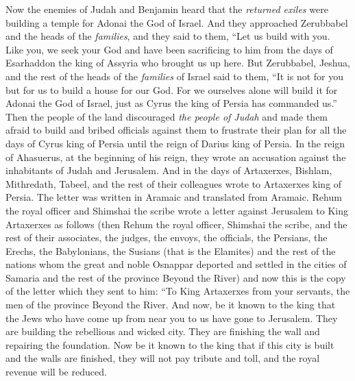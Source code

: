 \begin{biblechapter} %
 Now the enemies of Judah and Benjamin heard that the \textit{returned exiles} were building a temple for Adonai the God of Israel.
\verse And they approached Zerubbabel and the heads of the \textit{families}, and they said to them, “Let us build with you. Like you, we seek your God and have been sacrificing to him from the days of Esarhaddon the king of Assyria who brought us up here.
\verse But Zerubbabel, Jeshua, and the rest of the heads of the \textit{families} of Israel said to them, “It is not for you but for us to build a house for our God. For we ourselves alone will build it for Adonai the God of Israel, just as Cyrus the king of Persia has commanded us.”
\verse Then the people of the land discouraged \textit{the people of Judah} and made them afraid to build
\verse and bribed officials against them to frustrate their plan for all the days of Cyrus king of Persia until the reign of Darius king of Persia.
 In the reign of Ahasuerus, at the beginning of his reign, they wrote an accusation against the inhabitants of Judah and Jerusalem.
\verse And in the days of Artaxerxes, Bishlam, Mithredath, Tabeel, and the rest of their colleagues wrote to Artaxerxes king of Persia. The letter was written in Aramaic and translated from Aramaic.
\verse Rehum the royal officer and Shimshai the scribe wrote a letter against Jerusalem to King Artaxerxes as follows
\verse (then Rehum the royal officer, Shimshai the scribe, and the rest of their associates, the judges, the envoys, the officials, the Persians, the Erechs, the Babylonians, the Susians (that is the Elamites)
\verse and the rest of the nations whom the great and noble Osnappar deported and settled in the cities of Samaria and the rest of the province Beyond the River) and now
\verse this is the copy of the letter which they sent to him:
\verse “To King Artaxerxes from your servants, the men of the province Beyond the River. And now,
\verse be it known to the king that the Jews who have come up from near you to us have gone to Jerusalem. They are building the rebellious and wicked city. They are finishing the wall and repairing the foundation.
\verse Now be it known to the king that if this city is built and the walls are finished, they will not pay tribute and toll, and the royal revenue will be reduced.

\end{biblechapter}
